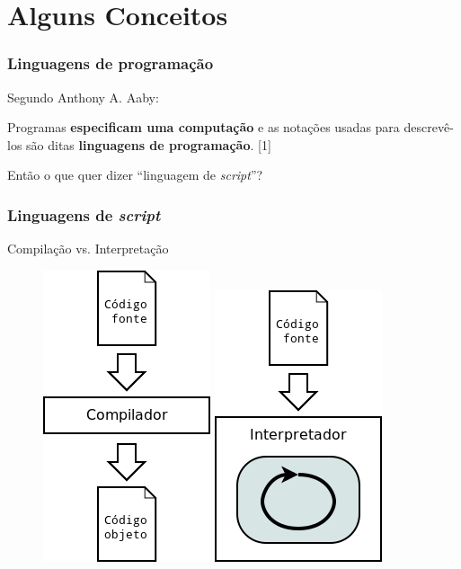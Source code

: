\documentclass[brazil]{beamer}
\begin{document}
\section{Alguns Conceitos}
\begin{frame}[fragile]
  \frametitle{Linguagens de programação}
  \pause
  Segundo Anthony A. Aaby:
  \pause
  \vspace{2em}
  \begin{block}{}
    Programas \textbf{especificam uma computação} e as notações usadas para
    descrevê-los são ditas \textbf{linguagens de programação}. [1]
  \end{block}
  \pause
  \vspace{2em}
  \begin{center}
    Então o que quer dizer ``linguagem de \textit{script}''?
  \end{center}
\end{frame}
\begin{frame}[fragile]
  \frametitle{Linguagens de \textit{script}}
  \pause
  \begin{center}
    \LARGE
    Compilação vs. Interpretação
  \end{center}
  \pause
  \begin{figure}
    \includegraphics[width=.2\textwidth]{images/compilador.png}
    \hspace{5em}
    \pause
    \includegraphics[width=.2\textwidth]{images/interpretador.png}
  \end{figure}
\end{frame}
\end{document}
